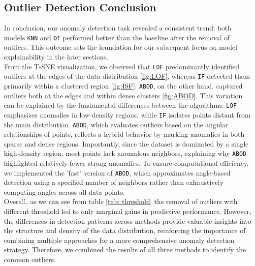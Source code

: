 \subsection{Outlier Detection Conclusion}
In conclusion, our anomaly detection task revealed a consistent trend: both models \texttt{KNN} and \texttt{DT} performed better than the 
baseline after the removal of outliers. This outcome sets the foundation for our subsequent focus on model 
explainability in the later sections.\\ 
From the T-SNE visualization, we observed that \texttt{LOF} predominantly 
identified outliers at the edges of the data distribution \ref{fig:LOF}, whereas \texttt{IF} detected 
them primarily within a clustered region \ref{fig:ISF}. \texttt{ABOD}, on the other hand, captured outliers both at 
the edges and within dense clusters \ref{fig:ABOD}. This variation can be explained by the fundamental 
differences between the algorithms: \texttt{LOF} emphasizes anomalies in low-density regions, 
while \texttt{IF} isolates points distant from the main distribution. 
\texttt{ABOD}, which evaluates outliers based on the angular relationships of points, reflects a hybrid behavior by 
marking anomalies in both sparse and dense regions. Importantly, since the dataset is dominated by a 
single high-density region, most points lack anomalous neighbors, explaining why \texttt{ABOD} highlighted relatively 
fewer strong anomalies. To ensure computational efficiency, we implemented the 'fast' version of \texttt{ABOD}, 
which approximates angle-based detection using a specified number of neighbors rather than exhaustively 
computing angles across all data points. \\
Overall, as we can see from table \ref{tab: threshold} the removal of outliers with different threshold led to only marginal gains in predictive performance.
However, the differences in detection patterns across methods provide valuable insights into the structure and density 
of the data distribution, reinforcing the importance of combining multiple approaches for a more 
comprehensive anomaly detection strategy. Therefore, we combined the results of all three methods to identify the common outliers.





